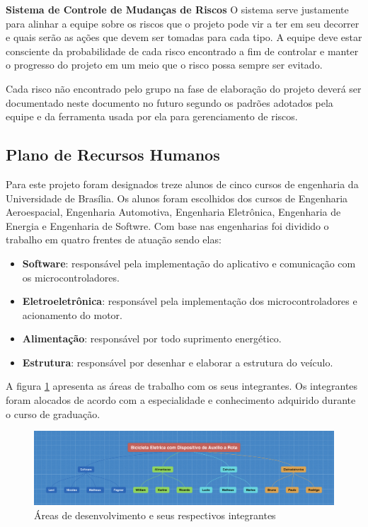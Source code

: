 		\textbf{Sistema de Controle de Mudanças de Riscos}
		O sistema serve justamente para alinhar a equipe sobre os riscos que o projeto pode vir a ter em seu decorrer e quais serão as ações que devem ser tomadas para cada tipo. A equipe deve estar consciente da probabilidade de cada risco encontrado a fim de controlar e manter o progresso do projeto em um meio que o risco possa sempre ser evitado.
		
		Cada risco não encontrado pelo grupo na fase de elaboração do projeto deverá ser documentado neste documento no futuro segundo os padrões adotados pela equipe e da ferramenta usada por ela para gerenciamento de riscos.

    \subsection{Plano de Recursos Humanos}
	Para este projeto foram designados treze alunos de cinco cursos de engenharia da Universidade de Brasília. Os alunos foram escolhidos dos cursos de Engenharia Aeroespacial, Engenharia Automotiva, Engenharia Eletrônica, Engenharia de Energia e Engenharia de Softwre. Com base nas engenharias foi dividido o trabalho em quatro frentes de atuação sendo elas:
	\begin{itemize}
		\item \textbf{Software}: responsável pela implementação do aplicativo e comunicação com os microcontroladores.
		\item \textbf{Eletroeletrônica}: responsável pela implementação dos microcontroladores e acionamento do motor.
		\item \textbf{Alimentação}: responsável por todo suprimento energético.
		\item \textbf{Estrutura}: responsável por desenhar e elaborar a estrutura do veículo.
	\end{itemize}
	
	A figura \ref{img:projeto} apresenta as áreas de trabalho com os seus integrantes. Os integrantes foram alocados de acordo com a especialidade e conhecimento adquirido durante o curso de graduação.
	
	\graphicspath{{figuras/}}
	\begin{figure}[h!]
	\centering
	\includegraphics[width=\textwidth]{project.png}
	\caption{Áreas de desenvolvimento e seus respectivos integrantes}
	\label{img:projeto}
	\end{figure}


